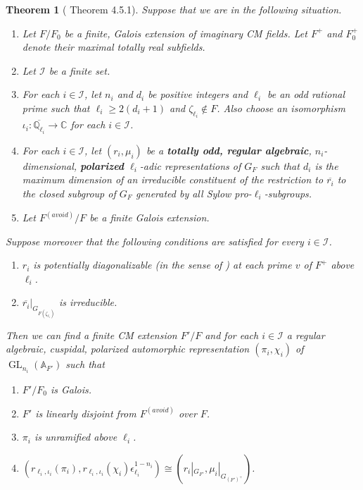 \documentclass{amsart}
\newtheorem{theorem}{Theorem}[section]
\theoremstyle{definition}
\numberwithin{equation}{section} %
\newcommand{\GL}{\operatorname{GL}}
\newcommand{\bb}[1]{\mathbb{#1}}
\newcommand{\mc}[1]{\mathcal{#1}}
\newcommand{\ol}[1]{\overline{#1}}
\begin{document}
\begin{theorem}[\cite{BLGGT14} Theorem 4.5.1] \label{thm: blggt potential automorphy}
    Suppose that we are in the following situation.
    \begin{enumerate}
        \item Let \( F/F_0 \) be a finite, Galois extension of imaginary CM fields. Let \( F^+ \) and \( F_0^+ \) denote their maximal totally real subfields.
        \item Let \( \mc{I} \) be a finite set.
        \item For each \( i\in\mc{I} \), let \( n_i \) and \( d_i \) be positive integers and \( \ell_i \) be an odd rational prime such that \( \ell_i\geq 2(d_i+1) \) and \( \zeta_{\ell_i}\notin F \). Also choose an isomorphism \( \iota_i: \ol{\bb{Q}_{\ell_i}}\to\bb{C} \) for each \( i\in\mc{I} \).
        \item For each \( i\in\mc{I} \), let \( (r_i,\mu_i) \) be a \textbf{totally odd, regular algebraic}, \( n_i \)-dimensional, \textbf{polarized} \( \ell_i \)-adic representations of \( G_F \) such that \( d_i \) is the maximum dimension of an irreducible constituent of the restriction to \( \ol{r_i} \) to the closed subgroup of \( G_F \) generated by all Sylow pro-\( \ell_i \)-subgroups.
        \item Let \( F^{(avoid)}/F \) be a finite Galois extension.
    \end{enumerate}
    Suppose moreover that the following conditions are satisfied for every \( i\in\mc{I} \).
    \begin{enumerate}
        \item \( r_i \) is potentially diagonalizable (in the sense of \cite[\S 1.4]{BLGGT14})
        at each prime \( v \) of \( F^+ \) above \( \ell_i \).
        \item \( \ol{r_i}|_{G_{F(\zeta_{\ell_i})}} \) is irreducible.
    \end{enumerate}
    Then we can find a finite CM extension \( F'/F \) and for each \( i\in\mc{I} \) a regular algebraic, cuspidal, polarized automorphic representation \( (\pi_i,\chi_i) \) of \( \GL_{n_i}(\bb{A}_{F'}) \) such that
    \begin{enumerate}
        \item \( F'/F_0 \) is Galois.
        \item \( F' \) is linearly disjoint from \( F^{(avoid)} \) over \( F \).
        \item \( \pi_i \) is unramified above \( \ell_i \).
        \item \( (r_{\ell_i,\iota_i}(\pi_i),r_{\ell_i,\iota_i}(\chi_i)\epsilon_{\ell_i}^{1-n_i}) \cong (r_{i}|_{G_{F'}},\mu_i|_{G_{(F')^+}}) \).
    \end{enumerate}
\end{theorem}
\end{document}
